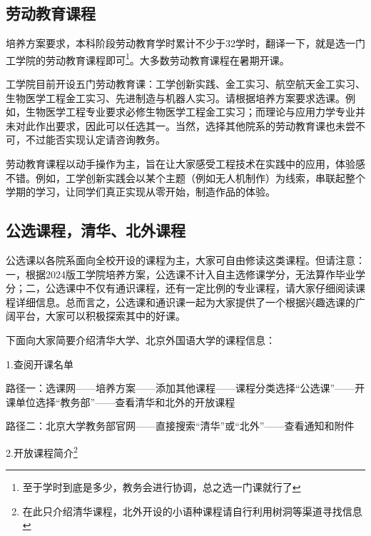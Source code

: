 \documentclass[11pt,oneside]{book}
\begin{document}
\subsection{劳动教育课程}
培养方案要求，本科阶段劳动教育学时累计不少于32学时，翻译一下，就是选一门工学院的劳动教育课程即可\footnote{至于学时到底是多少，教务会进行协调，总之选一门课就行了}。大多数劳动教育课程在暑期开课。

\vspace{20pt}

工学院目前开设五门劳动教育课：工学创新实践、金工实习、航空航天金工实习、生物医学工程金工实习、先进制造与机器人实习。请根据培养方案要求选课。例如，生物医学工程专业要求必修生物医学工程金工实习；而理论与应用力学专业并未对此作出要求，因此可以任选其一。当然，选择其他院系的劳动教育课也未尝不可，不过能否实现认定请咨询教务。

\vspace{20pt}

劳动教育课程以动手操作为主，旨在让大家感受工程技术在实践中的应用，体验感不错。例如，工学创新实践会以某个主题（例如无人机制作）为线索，串联起整个学期的学习，让同学们真正实现从零开始，制造作品的体验。

\subsection{公选课程，清华、北外课程}
公选课以各院系面向全校开设的课程为主，大家可自由修读这类课程。但请注意：一，根据2024版工学院培养方案，公选课不计入自主选修课学分，无法算作毕业学分；二，公选课中不仅有通识课程，还有一定比例的专业课程，请大家仔细阅读课程详细信息。总而言之，公选课和通识课一起为大家提供了一个根据兴趣选课的广阔平台，大家可以积极探索其中的好课。

\vspace{20pt}

下面向大家简要介绍清华大学、北京外国语大学的课程信息：

\vspace{20pt}

1.查阅开课名单

路径一：选课网——培养方案——添加其他课程——课程分类选择“公选课”——开课单位选择“教务部”——查看清华和北外的开放课程

路径二：北京大学教务部官网——直接搜索“清华”或“北外”——查看通知和附件

\vspace{20pt}

2.开放课程简介\footnote{在此只介绍清华课程，北外开设的小语种课程请自行利用树洞等渠道寻找信息}
\end{document}
